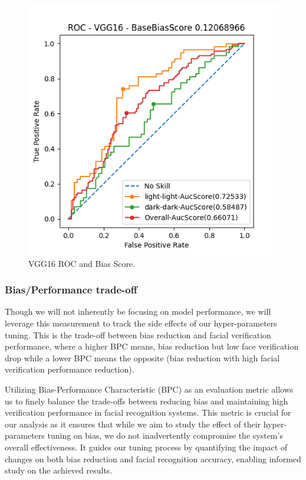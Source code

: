 \documentclass[conference]{IEEEtran}
\begin{document}
\begin{figure}[htbp]
    \centerline{\includegraphics[width=0.9\linewidth]{latex/images/VGG16.png}}
    \caption{VGG16 ROC and Bias Score.}
    \label{vgg16_roc}
\end{figure}

\subsubsection{Bias/Performance trade-off}
Though we will not inherently be focusing on model performance, we will leverage this measurement to track the side effects of our hyper-parameters tuning.
This is the trade-off between bias reduction and facial verification performance, where a higher BPC means, bias reduction but low face verification drop while a lower BPC means the opposite (bias reduction with high facial verification performance reduction).

Utilizing Bias-Performance Characteristic (BPC) as an evaluation metric allows us to finely balance the trade-offs between reducing bias and maintaining high verification performance in facial recognition systems. This metric is crucial for our analysis as it ensures that while we aim to study the effect of their hyper-parameters tuning on bias, we do not inadvertently compromise the system's overall effectiveness. It guides our tuning process by quantifying the impact of changes on both bias reduction and facial recognition accuracy, enabling informed study on the achieved results.
\end{document}
